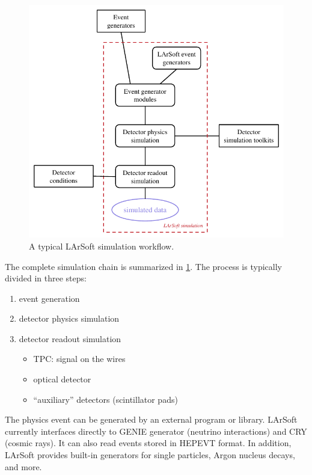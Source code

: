 \begin{figure}[htbp]
  \centering
  \includegraphics{figures/LArSoftSimulationWorkflow.pdf}
  \caption{\label{fig:LArSoftSimulation}A typical LArSoft simulation workflow.}
\end{figure}
The complete simulation chain is summarized in \cref{fig:LArSoftSimulation}.
The process is typically divided in three steps:
\begin{enumerate}
   \item event generation
   \item detector physics simulation
   \item detector readout simulation
      \begin{itemize}
         \item TPC: signal on the wires
         \item optical detector
         \item ``auxiliary'' detectors (\eg scintillator pads)
      \end{itemize}
\end{enumerate}

The physics event can be generated by an external program or library.
LArSoft currently interfaces directly to GENIE generator (neutrino interactions)
and CRY (cosmic rays). It can also read events stored in HEPEVT\cite{HEPEVT} format.
In addition, LArSoft provides built-in generators for single particles,
Argon nucleus decays, and more.

